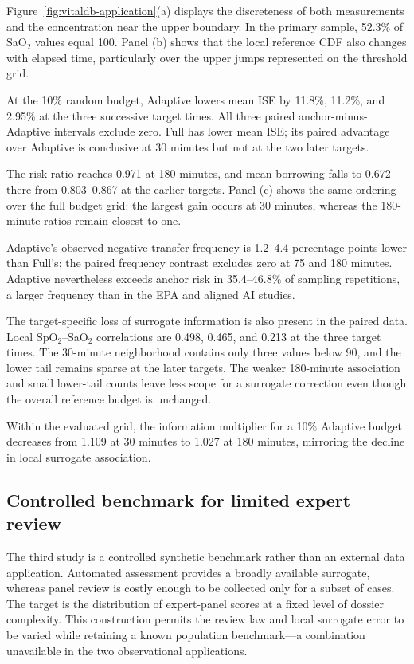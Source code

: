 Figure~\ref{fig:vitaldb-application}(a) displays the discreteness of both
measurements and the concentration near the upper boundary. In the primary
sample, 52.3\% of SaO\(_2\) values equal 100. Panel (b) shows that the local
reference CDF also changes with elapsed time, particularly over the upper
jumps represented on the threshold grid.

At the 10\% random budget, Adaptive lowers mean ISE by 11.8\%, 11.2\%, and
2.95\% at the three successive target times. All three paired
anchor-minus-Adaptive intervals exclude zero. Full has lower mean ISE; its
paired advantage over Adaptive is conclusive at 30 minutes but not at the two
later targets.

The risk ratio reaches 0.971 at 180 minutes, and mean borrowing falls to 0.672
there from 0.803--0.867 at the earlier targets. Panel (c) shows the same
ordering over the full budget grid: the largest gain occurs at 30 minutes,
whereas the 180-minute ratios remain closest to one.

Adaptive's observed negative-transfer frequency is 1.2--4.4 percentage points
lower than Full's; the paired frequency contrast excludes zero at 75 and 180
minutes. Adaptive nevertheless exceeds anchor risk in 35.4--46.8\% of sampling repetitions,
a larger frequency than in the EPA and aligned AI studies.

The target-specific loss of surrogate information is also present in the
paired data. Local SpO\(_2\)--SaO\(_2\) correlations are 0.498, 0.465, and
0.213 at the three target times. The 30-minute neighborhood contains only
three values below 90, and the lower tail remains sparse at the later targets.
The weaker 180-minute association and small lower-tail counts leave less scope
for a surrogate correction even though the overall reference budget is
unchanged.

Within the evaluated grid, the information multiplier for a 10\% Adaptive
budget decreases from 1.109 at 30 minutes to 1.027 at 180 minutes, mirroring
the decline in local surrogate association.

\subsection{Controlled benchmark for limited expert review}

The third study is a controlled synthetic benchmark rather than an external
data application. Automated assessment provides a broadly available surrogate,
whereas panel review is costly enough to be collected only for a subset of
cases. The target is the distribution of expert-panel scores at a fixed level
of dossier complexity. This construction permits the review law and local
surrogate error to be varied while retaining a known population benchmark---a
combination unavailable in the two observational applications.


